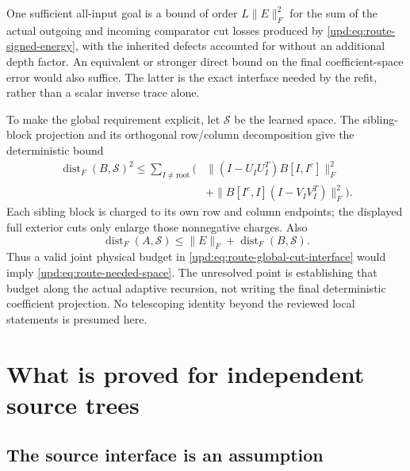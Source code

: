 \documentclass[11pt,oneside,openany,a4paper]{book}
\numberwithin{equation}{chapter}
\theoremstyle{definition}
\theoremstyle{remark}
\begin{document}
One sufficient all-input goal is a bound of order
$L\lVert E\rVert_F^2$ for the sum of the actual outgoing and incoming
comparator cut losses produced by \eqref{upd:eq:route-signed-energy}, with
the inherited defects accounted for without an additional depth
factor.  An equivalent or stronger direct bound on the final
coefficient-space error would also suffice.  The latter is the exact
interface needed by the refit, rather than a scalar inverse trace alone.

To make the global requirement explicit, let $\mathcal S$ be the learned
space.  The sibling-block projection and its orthogonal row/column
decomposition give the deterministic bound
\begin{align}
 \operatorname{dist}_F(B,\mathcal S)^2
 \leq\sum_{I\ne\mathrm{root}}\bigl(&
 \lVert(I-U_IU_I^T)B[I,I^c]\rVert_F^2\nonumber\\[-2pt]
 &+\lVert B[I^c,I](I-V_IV_I^T)\rVert_F^2\bigr).
 \label{upd:eq:route-global-cut-interface}
\end{align}
Each sibling block is charged to its own row and column endpoints;
the displayed full exterior cuts only enlarge those nonnegative
charges.  Also
\[
 \operatorname{dist}_F(A,\mathcal S)
 \leq\lVert E\rVert_F+\operatorname{dist}_F(B,\mathcal S).
\]
Thus a valid joint physical budget in
\eqref{upd:eq:route-global-cut-interface} would imply
\eqref{upd:eq:route-needed-space}.  The unresolved point is establishing
that budget along the actual adaptive recursion, not writing the final
deterministic coefficient projection.  No telescoping identity beyond
the reviewed local statements is presumed here.

\chapter{What is proved for independent source trees}
\label{upd:chap:route-sources}

\section{The source interface is an assumption}
\end{document}

